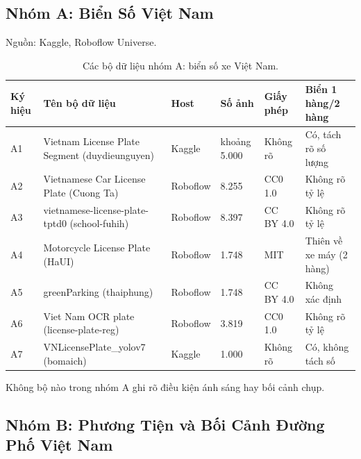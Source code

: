 \subsection{Nhóm A: Biển Số Việt Nam}

\begin{table}[htbp]
\centering
\caption{Các bộ dữ liệu nhóm A: biển số xe Việt Nam.}

{\footnotesize Nguồn: Kaggle, Roboflow Universe.}
\label{tab:dataset-a}
\small
\begin{tabular}{p{0.8cm} p{3.2cm} p{1.4cm} p{1.6cm} p{1.6cm} p{2.0cm}}
\toprule
\textbf{Ký hiệu} & \textbf{Tên bộ dữ liệu} & \textbf{Host} & \textbf{Số ảnh} & \textbf{Giấy phép} & \textbf{Biển 1 hàng/2 hàng} \\
\midrule
A1 & Vietnam License Plate Segment (duydieunguyen)~\autocite{duydieunguyen2023vnplatesegment} & Kaggle & khoảng 5.000 & Không rõ & Có, tách rõ số lượng \\
A2 & Vietnamese Car License Plate (Cuong Ta)~\autocite{cuongta2021vnplate} & Roboflow & 8.255 & CC0 1.0 & Không rõ tỷ lệ \\
A3 & vietnamese-license-plate-tptd0 (school-fuhih)~\autocite{schoolfuhih2023vnplate} & Roboflow & 8.397 & CC BY 4.0 & Không rõ tỷ lệ \\
A4 & Motorcycle License Plate (HaUI)~\autocite{haui2023motorcycleplate} & Roboflow & 1.748 & MIT & Thiên về xe máy (2 hàng) \\
A5 & greenParking (thaiphung) & Roboflow & 1.748 & CC BY 4.0 & Không xác định \\
A6 & Viet Nam OCR plate (license-plate-reg)~\autocite{licenseplatereg2025ocrplate} & Roboflow & 3.819 & CC0 1.0 & Không rõ tỷ lệ \\
A7 & VNLicensePlate\_yolov7 (bomaich)~\autocite{bomaich2022vnlicenseplate7} & Kaggle & 1.000 & Không rõ & Có, không tách số \\
\bottomrule
\end{tabular}
\end{table}

Không bộ nào trong nhóm A ghi rõ điều kiện ánh sáng hay bối cảnh chụp.

\subsection{Nhóm B: Phương Tiện và Bối Cảnh Đường Phố Việt Nam}

